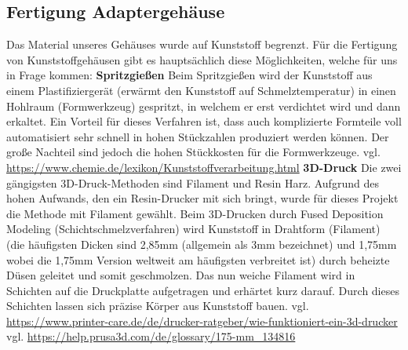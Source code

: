 \documentclass[]{article}
\begin{document}
\subsection{Fertigung Adaptergehäuse}
Das Material unseres Gehäuses wurde auf Kunststoff begrenzt. Für die Fertigung von Kunststoffgehäusen gibt es hauptsächlich diese Möglichkeiten, welche für uns in Frage kommen:
\vspace{4mm}\newline
\textbf{Spritzgießen} \newline
\glqq Beim Spritzgießen wird der Kunststoff aus einem Plastifiziergerät (erwärmt den Kunststoff auf Schmelztemperatur) in einen Hohlraum (Formwerkzeug) gespritzt, in welchem er erst verdichtet wird und dann erkaltet.\grqq \newline 
Ein Vorteil für dieses Verfahren ist, dass auch komplizierte Formteile voll automatisiert sehr schnell in hohen Stückzahlen produziert werden können.
Der große Nachteil sind jedoch die hohen Stückkosten für die Formwerkzeuge.\vspace{4mm}\newline 
vgl. \url{https://www.chemie.de/lexikon/Kunststoffverarbeitung.html}
\vspace{4mm}\newline
\textbf{3D-Druck} \newline
Die zwei gängigsten 3D-Druck-Methoden sind Filament und Resin Harz. Aufgrund des hohen Aufwands, den ein Resin-Drucker mit sich bringt, wurde für dieses Projekt die Methode mit Filament gewählt. \newline
Beim 3D-Drucken durch Fused Deposition Modeling (Schichtschmelzverfahren) wird Kunststoff in Drahtform (Filament) (die häufigsten Dicken sind 2,85mm (allgemein als 3mm bezeichnet) und 1,75mm wobei die 1,75mm Version weltweit am häufigsten verbreitet ist) durch beheizte Düsen geleitet und somit geschmolzen. Das nun weiche Filament wird in Schichten auf die Druckplatte aufgetragen und erhärtet kurz darauf. Durch dieses Schichten lassen sich präzise Körper aus Kunststoff bauen.
\vspace{4mm}\newline
vgl. \url{https://www.printer-care.de/de/drucker-ratgeber/wie-funktioniert-ein-3d-drucker}\newline
vgl. \url{https://help.prusa3d.com/de/glossary/175-mm_134816}
\end{document}
